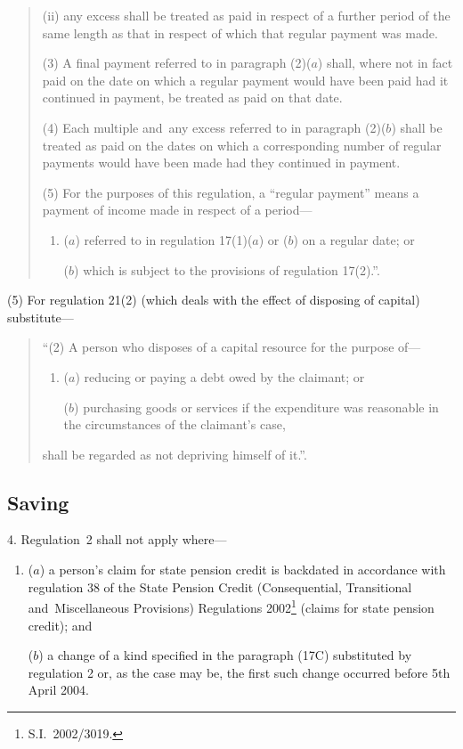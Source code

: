 \documentclass[12pt,a4paper]{article}
\begin{document}
\begin{quotation}
\begin{enumerate}
\begin{enumerate}
(ii) any excess shall be treated as paid in respect of a further period of the same length as that in respect of which that regular payment was made.
\end{enumerate}
\end{enumerate}

(3)  A final payment referred to in paragraph (2)($a$)  shall, where not in fact paid on the date on which a regular payment would have been paid had it continued in payment, be treated as paid on that date.

(4) Each multiple and~any excess referred to in paragraph (2)($b$)  shall be treated as paid on the dates on which a corresponding number of regular payments would have been made had they continued in payment.

(5) For the purposes of this regulation, a “regular payment” means a payment of income made in respect of a period—
\begin{enumerate}\item[]
($a$) referred to in regulation 17(1)($a$)  or ($b$)  on a regular date; or

($b$) which is subject to the provisions of regulation 17(2).”.
\end{enumerate}
\end{quotation}

(5) For regulation 21(2) (which deals with the effect of disposing of capital) substitute—
\begin{quotation}
“(2) A person who disposes of a capital resource for the purpose of—
\begin{enumerate}\item[]
($a$) reducing or paying a debt owed by the claimant; or

($b$) purchasing goods or services if the expenditure was reasonable in the circumstances of the claimant’s case,
\end{enumerate}
shall be regarded as not depriving himself of it.”.
\end{quotation}

\subsection[4. Saving]{Saving}

4.  Regulation~2 shall not apply where—
\begin{enumerate}\item[]
($a$) a person’s claim for state pension credit is backdated in accordance with regulation 38 of the State Pension Credit (Consequential, Transitional and~Miscellaneous Provisions) Regulations 2002\footnote{S.I.~2002/3019.} (claims for state pension credit); and

($b$) a change of a kind specified in the paragraph (17C) substituted by regulation 2 or, as the case may be, the first such change occurred before 5th April 2004.
\end{enumerate}
\end{document}
